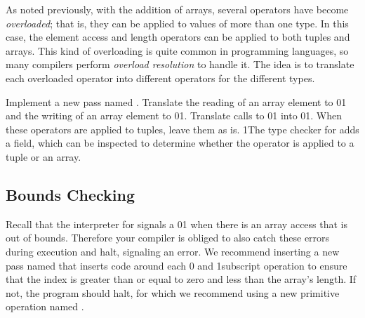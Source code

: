 \documentclass[7x10]{TimesAPriori_MIT}%
\def\racketEd{0}
\def\pythonEd{1}
\providecommand{\BookEdition}{1}
\let\edition\BookEdition
\newcommand{\racket}[1]{{\if\edition\racketEd{#1}\fi}}
\newcommand{\pythonColor}[0]{}
\newcommand{\python}[1]{{\if\edition\pythonEd\pythonColor #1\fi}}
\numberwithin{theorem}{chapter}
\numberwithin{definition}{chapter}
\numberwithin{equation}{chapter}
\begin{document}
As noted previously, with the addition of arrays, several operators
have become \emph{overloaded}; that is, they can be applied to values
of more than one type. In this case, the element access and length
operators can be applied to both tuples and arrays. This kind of
overloading is quite common in programming languages, so many
compilers perform \emph{overload resolution} to handle it. The idea is to translate each overloaded
operator into different operators for the different types.

Implement a new pass named . 
Translate the reading of an array element to
\racket{}\python{}
and the writing of an array element to
\racket{}\python{}.
Translate calls to \racket{}\python{}
into \racket{}\python{}.
When these operators are applied to tuples, leave them as is.
%
\python{The type checker for \LangArray{} adds a \code{has\_type}
  field, which can be inspected to determine whether the operator
  is applied to a tuple or an array.}


\subsection{Bounds Checking}

Recall that the interpreter for \LangArray{} signals a
\racket{}\python{}
when there is an array access that is out of
bounds. Therefore your compiler is obliged to also catch these errors
during execution and halt, signaling an error. We recommend inserting
a new pass named  that inserts code around each
\racket{ and }
\python{subscript} operation to ensure that the index is greater than
or equal to zero and less than the array's length. If not, the program
should halt, for which we recommend using a new primitive operation
named .


\end{document}
